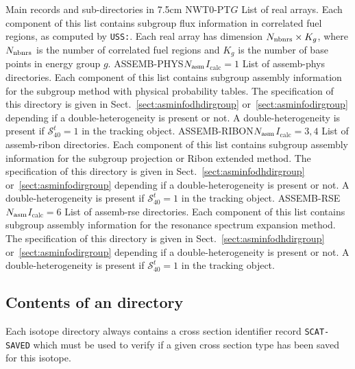 \begin{DescriptionEnregistrement}{Main records and sub-directories in }{7.5cm}\label{table:cordir}
\DirlEnr
  {NWT0-PT}{$G$}
  {List of real arrays. Each component of this list contains subgroup flux information in correlated fuel regions, as computed by {\tt USS:}.
  Each real array has dimension $N_{\rm nbnrs}\times K_g$, where $N_{\rm nbnrs}$ is the number of correlated fuel regions and $K_g$ is the
  number of base points in energy group $g$.}
\OptDirlEnr
  {ASSEMB-PHYS}{$N_{\rm asm}$}{$I_{\mathrm{calc}} = 1$}
  {List of {\sc assemb-phys} directories. Each component of this list contains subgroup assembly information for the subgroup method with
  physical probability tables. The specification of this directory is given in Sect.~\ref{sect:asminfodhdirgroup} or~\ref{sect:asminfodirgroup}
  depending if a double-heterogeneity is present or not. A double-heterogeneity is present if $\mathcal{S}^{t}_{40}=1$
  in the {\sc tracking} object.}
\OptDirlEnr
  {ASSEMB-RIBON}{$N_{\rm asm}$}{$I_{\mathrm{calc}} = 3,4$}
  {List of {\sc assemb-ribon} directories. Each component of this list contains subgroup assembly information for the subgroup projection
  or Ribon extended method. The specification of this directory is given in Sect.~\ref{sect:asminfodhdirgroup} or~\ref{sect:asminfodirgroup}
  depending if a double-heterogeneity is present or not. A double-heterogeneity is present if $\mathcal{S}^{t}_{40}=1$
  in the {\sc tracking} object.}
\OptDirlEnr
  {ASSEMB-RSE}{$N_{\rm asm}$}{$I_{\mathrm{calc}} = 6$}
  {List of {\sc assemb-rse} directories. Each component of this list contains subgroup assembly information for the resonance spectrum
  expansion method. The specification of this directory is given in Sect.~\ref{sect:asminfodhdirgroup} or~\ref{sect:asminfodirgroup}
  depending if a double-heterogeneity is present or not. A double-heterogeneity is present if $\mathcal{S}^{t}_{40}=1$
  in the {\sc tracking} object.}
\end{DescriptionEnregistrement}

\goodbreak

\subsection{Contents of an  directory}\label{sect:isotopedir}

Each isotope directory always contains a cross section identifier record {\tt SCAT-SAVED}
which must be used to verify if a given cross section type has
been saved for this isotope.

